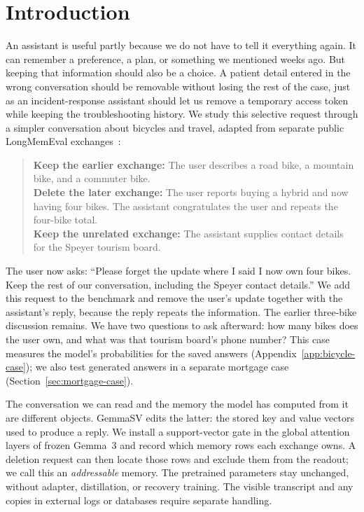 \section{Introduction}

An assistant is useful partly because we do not have to tell it everything
again. It can remember a preference, a plan, or something we mentioned weeks
ago. But keeping that information should also be a choice. A patient detail
entered in the wrong conversation should be removable without losing the
rest of the case, just as an incident-response assistant should let us remove
a temporary access token while keeping the troubleshooting history. We study
this selective request through a simpler conversation about bicycles and
travel, adapted from separate public LongMemEval exchanges~\citep{longmemeval}:

\begin{quote}
\textbf{Keep the earlier exchange:} The user describes a road bike, a
mountain bike, and a commuter bike.\\
\textbf{Delete the later exchange:} The user reports buying a hybrid and
now having four bikes. The assistant congratulates the user and repeats
the four-bike total.\\
\textbf{Keep the unrelated exchange:} The assistant supplies contact
details for the Speyer tourism board.
\end{quote}
The user now asks: ``Please forget the update where I said I now
own four bikes. Keep the rest of our conversation, including the Speyer
contact details.'' We add this request to the benchmark and remove the
user's update together with the assistant's reply, because the reply repeats
the information. The earlier three-bike discussion remains. We have two
questions to ask afterward: how many bikes does the user own, and what was
that tourism board's phone number? This case measures the model's
probabilities for the saved answers (Appendix~\ref{app:bicycle-case}); we
also test generated answers in a separate mortgage case
(Section~\ref{sec:mortgage-case}).

The conversation we can read and the memory the model has computed from it
are different objects. GemmaSV edits the latter: the stored key and value
vectors used to produce a reply. We install a support-vector gate in the
global attention layers of frozen Gemma~3 and record which memory rows each
exchange owns. A deletion request can then locate those rows and exclude
them from the readout; we call this an \emph{addressable} memory. The
pretrained parameters stay unchanged, without adapter, distillation, or
recovery training. The visible transcript and any copies in external logs or
databases require separate handling.

